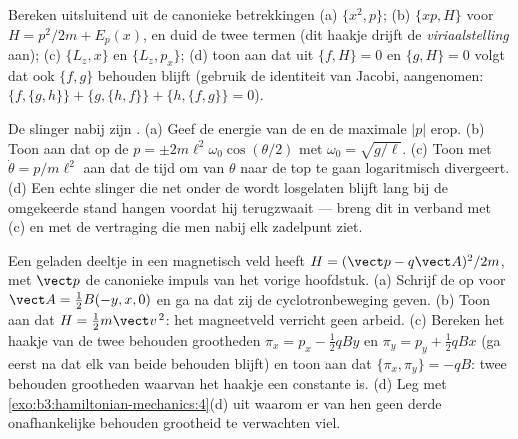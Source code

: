 \begin{exercise}[$\star$]\label{exo:b3:hamiltonian-mechanics:4}
Bereken uitsluitend uit de canonieke betrekkingen (a) $\{x^2, p\}$; (b)
$\{xp, H\}$ voor $H = p^2/2m + E_p(x)$, en duid de twee termen (dit
haakje drijft de \emph{viriaalstelling} aan); (c) $\{L_z, x\}$ en
$\{L_z, p_x\}$; (d) toon aan dat uit $\{f, H\} = 0$ en $\{g, H\} = 0$
volgt dat ook $\{f, g\}$ behouden blijft (gebruik de identiteit van
Jacobi, aangenomen: $\{f,\{g,h\}\} + \{g,\{h,f\}\} + \{h,\{f,g\}\} = 0$).
\end{exercise}

\begin{exercise}[$\star\star$]\label{exo:b3:hamiltonian-mechanics:5}
De slinger nabij zijn . (a) Geef de energie van de 
en de maximale $|p|$ erop. (b) Toon aan dat op de  $p =
\pm 2m\ell^2\omega_0\cos(\theta/2)$ met $\omega_0 = \sqrt{g/\ell}$.
(c) Toon met $\dot\theta = p/m\ell^2$ aan dat de tijd om van $\theta$
naar de top te gaan logaritmisch divergeert. (d) Een echte slinger die
net onder de  wordt losgelaten blijft lang bij de omgekeerde
stand hangen voordat hij terugzwaait --- breng dit in verband met (c) en
met de vertraging die men nabij elk zadelpunt ziet.
\end{exercise}

\begin{exercise}[$\star\star$]\label{exo:b3:hamiltonian-mechanics:6}
Een geladen deeltje in een magnetisch veld heeft $H = (\vect p -
q\vect A)^2/2m$, met $\vect p$ de canonieke impuls van het vorige
hoofdstuk. (a) Schrijf de  op voor $\vect A = \tfrac12
B(-y, x, 0)$ en ga na dat zij de cyclotronbeweging geven. (b)
Toon aan dat $H =
\tfrac12 m\vect v^{\,2}$: het magneetveld verricht geen
arbeid. (c) Bereken het haakje van de twee behouden grootheden $\pi_x = p_x - \tfrac12
qBy$ en $\pi_y = p_y + \tfrac12 qBx$ (ga eerst na dat elk
van beide behouden blijft) en toon aan dat $\{\pi_x, \pi_y\} = -qB$:
twee behouden grootheden waarvan het haakje een constante is. (d) Leg met
\cref{exo:b3:hamiltonian-mechanics:4}(d) uit waarom er van hen geen derde
onafhankelijke behouden grootheid te verwachten viel.
\end{exercise}

